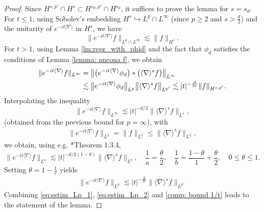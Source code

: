\documentclass[12pt]{article}
\theoremstyle{plain}
\begin{document}
	\begin{proof}
Since $H^{s,p'}\cap H^{s}\subset H^{s_d,p'}\cap H^{s_d}$, it suffices to prove the lemma for $s=s_d$. For $t\le1$, using Sobolev's embedding $H^{s}\hookrightarrow L^p\cap L^\infty$ (since $p\ge2$ and $s>\frac{d}2$) and the unitarity of $e^{-it\langle\nabla\rangle}$ in $H^{s}$, we have
\begin{equation}\label{eq:estim_Lp_1}
    \|e^{-it\langle \nabla \rangle} f\|_{L^{p}\cap L^\infty}\lesssim \|f\|_{H^{s}}.
\end{equation}
		For $t>1$, using Lemma \ref{lm:repr_with_phid} and the fact that $\phi_d$ satisfies the conditions of Lemma \ref{lemma: ancona f}, we obtain
		\begin{align}
		    \|e^{-it\langle \nabla \rangle} f\|_{ L^\infty}&=\big\|\big(e^{-it\langle\nabla\rangle}\phi_d\big)*\big(\langle\nabla\rangle^{s}f\big)\big\|_{L^\infty}\notag\\
		    &\lesssim\big\|e^{-it\langle\nabla\rangle}\phi_d\big\|_{L^p}\big\|\langle\nabla\rangle^{s}f\big\|_{L^{p'}}\lesssim| t|^{-\frac{d}{2r}}\|f\|_{H^{s,p'}}.\label{eq:estim_Lp_2}
		\end{align}
Interpolating the inequality  
		\begin{equation*}
			\|e^{-it\langle \nabla \rangle} f\|_{L^\infty} \lesssim |t|^{ -d/2 }\|\langle \nabla\rangle^{s} f\|_{L^{1}},
		\end{equation*}
(obtained from the previous bound for $p=\infty$), with 
		\begin{align*}
			\|e^{-it\langle \nabla \rangle} f\|_{L^2} = \|f\|_{L^2}\leq  \|\langle \nabla\rangle^{s} f\|_{L^{2}},
		\end{align*}
		we obtain, using e.g. \cite{grafakos}*{Theorem 1.3.4}, 
		\begin{equation*}
			\|e^{-it\langle \nabla \rangle} f\|_{L^a} \lesssim |t|^{ -d/2(1-\theta) } \|\langle \nabla\rangle^{s} f\|_{L^{b}}, \quad \frac{1}{a} = \frac{\theta}{2}, \quad\frac{1}{b} = \frac{1-\theta}{1} + \frac{\theta}{2}, \quad 0\le\theta\le1.
		\end{equation*}
		Setting $\theta = 1-\frac{1}{r}$ yields
		\begin{align}
			\label{comp: bound 1/t}
			\|e^{-it\langle \nabla \rangle} f\|_{L^{p}} \lesssim |t|^{-\frac{d}{2r}}  \|\langle \nabla \rangle^{s} f\|_{L^{p'}}
		\end{align}
	Combining \eqref{eq:estim_Lp_1}, \eqref{eq:estim_Lp_2} and \eqref{comp: bound 1/t} leads to the statement of the lemma.
	\end{proof}
	
\end{document}

